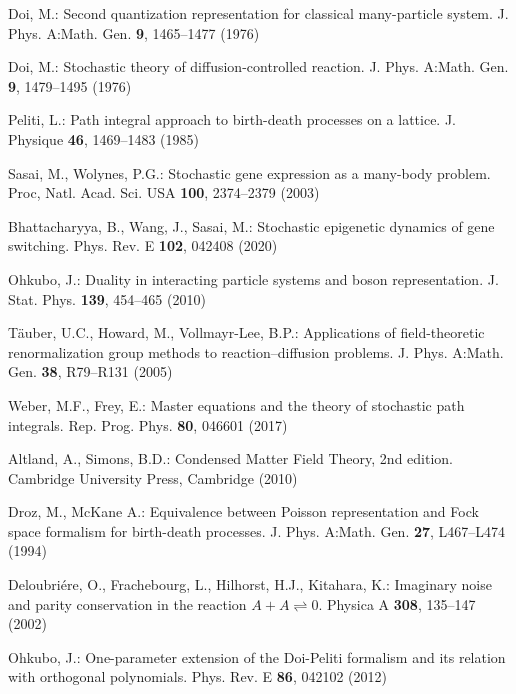 \documentclass[sn-mathphys,Numbered]{sn-jnl}%
\theoremstyle{thmstyleone}%
\theoremstyle{thmstyletwo}%
\theoremstyle{thmstylethree}%
\begin{document}
\begin{thebibliography}{99}


Doi, M.:
Second quantization representation for classical many-particle system. 
J. Phys. A:Math. Gen. \textbf{9}, 1465--1477 (1976)

Doi, M.:
Stochastic theory of diffusion-controlled reaction. 
J. Phys. A:Math. Gen. \textbf{9}, 1479--1495 (1976)

Peliti, L.:
Path integral approach to birth-death processes on a lattice.
J. Physique \textbf{46}, 1469--1483 (1985)


Sasai, M., Wolynes, P.G.:
Stochastic gene expression as a many-body problem.
Proc, Natl. Acad. Sci. USA \textbf{100}, 2374--2379 (2003)

Bhattacharyya, B., Wang, J., Sasai, M.:
Stochastic epigenetic dynamics of gene switching.
Phys. Rev. E \textbf{102}, 042408 (2020)


Ohkubo, J.:
Duality in interacting particle systems and boson representation.
J. Stat. Phys. \textbf{139}, 454--465 (2010)


T{\"a}uber, U.C., Howard, M., Vollmayr-Lee, B.P.:
Applications of field-theoretic renormalization group methods to reaction–diffusion problems.
J. Phys. A:Math. Gen. \textbf{38}, R79--R131 (2005)


Weber, M.F., Frey, E.:
Master equations and the theory of stochastic path integrals.
Rep. Prog. Phys. \textbf{80}, 046601 (2017) 

Altland, A., Simons, B.D.: 
Condensed Matter Field Theory, 2nd edition.
Cambridge University Press, Cambridge (2010)

Droz, M., McKane A.:
Equivalence between Poisson representation and Fock space formalism for birth-death processes.
J. Phys. A:Math. Gen. \textbf{27}, L467--L474 (1994) 

Deloubri{\'e}re, O., Frachebourg, L., Hilhorst, H.J., Kitahara, K.:
Imaginary noise and parity conservation in the reaction $A + A \rightleftharpoons 0$.
Physica A \textbf{308}, 135--147 (2002)


Ohkubo, J.:
One-parameter extension of the Doi-Peliti formalism and its relation with orthogonal polynomials.
Phys. Rev. E \textbf{86}, 042102 (2012)




\end{thebibliography}
\end{document}
